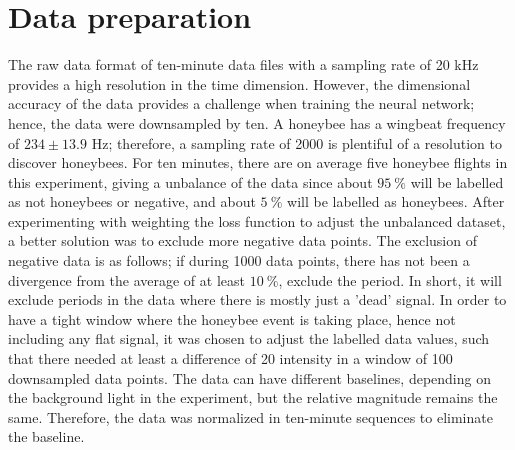 \section{Data preparation}

The raw data format of ten-minute data files with a sampling rate of 20 kHz\cite{rydhmer2021automating} provides a high resolution in the time dimension. However, the dimensional accuracy of the data provides a challenge when training the neural network; hence, the data were downsampled by ten. A honeybee has a wingbeat frequency of $234 \pm 13.9$ Hz\cite{10.1242/jeb.154609}; therefore, a sampling rate of 2000 is plentiful of a resolution to discover honeybees. 
For ten minutes, there are on average five honeybee flights in this experiment, giving a unbalance of the data since about $95 \:  \%$ will be labelled as not honeybees or negative, and about $5 \:  \%$ will be labelled as honeybees. After experimenting with weighting the loss function to adjust the unbalanced dataset, a better solution was to exclude more negative data points. The exclusion of negative data is as follows; if during 1000 data points, there has not been a divergence from the average of at least $10 \: \%$, exclude the period. In short, it will exclude periods in the data where there is mostly just a 'dead' signal. In order to have a tight window where the honeybee event is taking place, hence not including any flat signal, it was chosen to adjust the labelled data values, such that there needed at least a difference of 20 intensity in a window of 100 downsampled data points. 
The data can have different baselines, depending on the background light in the experiment, but the relative magnitude remains the same. Therefore, the data was normalized in ten-minute sequences to eliminate the baseline. 

